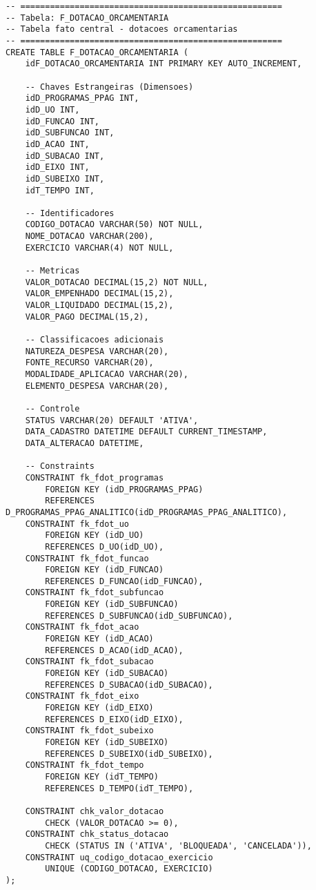 \documentclass[12pt,a4paper]{article}
\begin{document}
\begin{lstlisting}
-- =====================================================
-- Tabela: F_DOTACAO_ORCAMENTARIA
-- Tabela fato central - dotacoes orcamentarias
-- =====================================================
CREATE TABLE F_DOTACAO_ORCAMENTARIA (
    idF_DOTACAO_ORCAMENTARIA INT PRIMARY KEY AUTO_INCREMENT,
    
    -- Chaves Estrangeiras (Dimensoes)
    idD_PROGRAMAS_PPAG INT,
    idD_UO INT,
    idD_FUNCAO INT,
    idD_SUBFUNCAO INT,
    idD_ACAO INT,
    idD_SUBACAO INT,
    idD_EIXO INT,
    idD_SUBEIXO INT,
    idT_TEMPO INT,
    
    -- Identificadores
    CODIGO_DOTACAO VARCHAR(50) NOT NULL,
    NOME_DOTACAO VARCHAR(200),
    EXERCICIO VARCHAR(4) NOT NULL,
    
    -- Metricas
    VALOR_DOTACAO DECIMAL(15,2) NOT NULL,
    VALOR_EMPENHADO DECIMAL(15,2),
    VALOR_LIQUIDADO DECIMAL(15,2),
    VALOR_PAGO DECIMAL(15,2),
    
    -- Classificacoes adicionais
    NATUREZA_DESPESA VARCHAR(20),
    FONTE_RECURSO VARCHAR(20),
    MODALIDADE_APLICACAO VARCHAR(20),
    ELEMENTO_DESPESA VARCHAR(20),
    
    -- Controle
    STATUS VARCHAR(20) DEFAULT 'ATIVA',
    DATA_CADASTRO DATETIME DEFAULT CURRENT_TIMESTAMP,
    DATA_ALTERACAO DATETIME,
    
    -- Constraints
    CONSTRAINT fk_fdot_programas 
        FOREIGN KEY (idD_PROGRAMAS_PPAG) 
        REFERENCES D_PROGRAMAS_PPAG_ANALITICO(idD_PROGRAMAS_PPAG_ANALITICO),
    CONSTRAINT fk_fdot_uo 
        FOREIGN KEY (idD_UO) 
        REFERENCES D_UO(idD_UO),
    CONSTRAINT fk_fdot_funcao 
        FOREIGN KEY (idD_FUNCAO) 
        REFERENCES D_FUNCAO(idD_FUNCAO),
    CONSTRAINT fk_fdot_subfuncao 
        FOREIGN KEY (idD_SUBFUNCAO) 
        REFERENCES D_SUBFUNCAO(idD_SUBFUNCAO),
    CONSTRAINT fk_fdot_acao 
        FOREIGN KEY (idD_ACAO) 
        REFERENCES D_ACAO(idD_ACAO),
    CONSTRAINT fk_fdot_subacao 
        FOREIGN KEY (idD_SUBACAO) 
        REFERENCES D_SUBACAO(idD_SUBACAO),
    CONSTRAINT fk_fdot_eixo 
        FOREIGN KEY (idD_EIXO) 
        REFERENCES D_EIXO(idD_EIXO),
    CONSTRAINT fk_fdot_subeixo 
        FOREIGN KEY (idD_SUBEIXO) 
        REFERENCES D_SUBEIXO(idD_SUBEIXO),
    CONSTRAINT fk_fdot_tempo 
        FOREIGN KEY (idT_TEMPO) 
        REFERENCES D_TEMPO(idT_TEMPO),
    
    CONSTRAINT chk_valor_dotacao 
        CHECK (VALOR_DOTACAO >= 0),
    CONSTRAINT chk_status_dotacao 
        CHECK (STATUS IN ('ATIVA', 'BLOQUEADA', 'CANCELADA')),
    CONSTRAINT uq_codigo_dotacao_exercicio 
        UNIQUE (CODIGO_DOTACAO, EXERCICIO)
);


\end{lstlisting}
\end{document}
